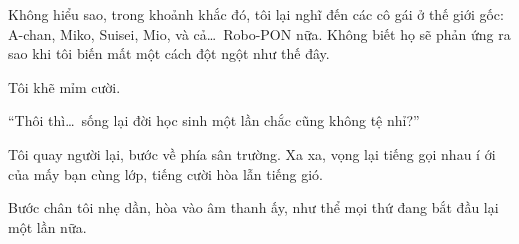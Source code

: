 \documentclass[../main.tex]{subfiles}
\begin{document}
Không hiểu sao, trong khoảnh khắc đó, tôi lại nghĩ đến các cô gái ở thế giới gốc: A-chan, Miko, Suisei, Mio, và cả\dots\ Robo-PON nữa. Không biết họ sẽ phản ứng ra sao khi tôi biến mất một cách đột ngột như thế đây.

Tôi khẽ mỉm cười.

``Thôi thì\dots\ sống lại đời học sinh một lần chắc cũng không tệ nhỉ?''

Tôi quay người lại, bước về phía sân trường. Xa xa, vọng lại tiếng gọi nhau í ới của mấy bạn cùng lớp, tiếng cười hòa lẫn tiếng gió.

Bước chân tôi nhẹ dần, hòa vào âm thanh ấy, như thể mọi thứ đang bắt đầu lại một lần nữa.
\end{document}
